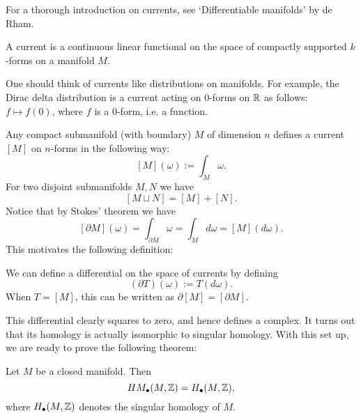 For a thorough introduction on currents, see `Differentiable manifolds' by de Rham.

\begin{definition}[Current]
    A current is a continuous linear functional on the space of compactly supported $k$-forms on a manifold $M$.
\end{definition}
\begin{remark}
    One should think of currents like distributions on manifolds. For example, the Dirac delta distribution is a current acting on $0$-forms on $\R$ as follows: $f \mapsto  f(0)$, where $f$ is a $0$-form, i.e. a function.
\end{remark}
\begin{eg}
    Any compact submanifold (with boundary) $M$ of dimension $n$ defines a current $[M]$ on $n$-forms in the following way:
    \[
        [M](\omega) := \int_M \omega
    .\] 
    For two disjoint submanifolds $M, N$ we have
    \[
        [M \sqcup N] = [M] + [N]
    .\] 
    Notice that by Stokes' theorem we have
    \[
        [\partial M](\omega) = \int_{\partial M} \omega = \int_M d \omega = [M](d \omega).
    \] 
    This motivates the following definition:
\end{eg}
\begin{definition}
    We can define a differential on the space of currents by defining
    \[
        (\partial T) (\omega) := T(d \omega)
    .\] 
    When $T = [M]$, this can be written as $\partial [M] = [\partial M]$. 
\end{definition}
This differential clearly squares to zero, and hence defines a complex.
It turns out that its homology is actually isomorphic to singular homology.
With this set up, we are ready to prove the following theorem:

\begin{theorem}
    Let $M$ be a closed manifold. Then
     \[
         \HMf[\bul]{M, \Z} = H_{\bul}(M, \Z)
    ,\] 
    where $H_{\bul}(M, \Z)$ denotes the singular homology of $M$.
\end{theorem}


